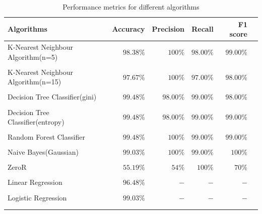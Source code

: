 \documentclass{article}
\begin{document}
\begin{table}[ht]
  \centering
  \caption{Performance metrics for different algorithms}
  \label{perfmetrics} 
  \vspace{\baselineskip}
  \begin{tabular}{lrrrrr}
  \toprule
  Algorithms & Accuracy & Precision & Recall & F1 score\\
  \midrule
  K-Nearest Neighbour Algorithm(n=5) & $98.38\%$ & $100\%$ & $98.00\%$ & $99.00\%$ \\\\ \hline \addlinespace
  K-Nearest Neighbour Algorithm(n=15) & $97.67\%$ & $100\%$ & $97.00\%$ & $98.00\%$ \\\\ \hline \addlinespace
  Decision Tree Classifier(gini) & $99.48\%$ & $98.00\%$ & $99.00\%$ & $98.00\%$ \\\\ \hline \addlinespace
  Decision Tree Classifier(entropy) & $99.48\%$ & $98.00\%$ & $99.00\%$ & $99.00\%$ \\\\ \hline \addlinespace
  Random Forest Classifier & $99.48\%$ & $100\%$ & $99.00\%$ & $99.00\%$ \\\\ \hline \addlinespace
  Naive Bayes(Gaussian) & $99.03\%$ & $100\%$ & $99.00\%$ & $100\%$ \\\\ \hline \addlinespace
  ZeroR & $55.19\%$ & $54\%$ & $100\%$ & $70\%$ \\\\ \hline \addlinespace
  Linear Regression & $96.48\%$ & $-$ & $-$ & $-$ \\\\ \hline \addlinespace
  Logistic Regression & $99.03\%$ & $-$ & $-$ & $-$ \\\\ \hline \addlinespace
  \end{tabular}\\ 
\end{table}
\end{document}
